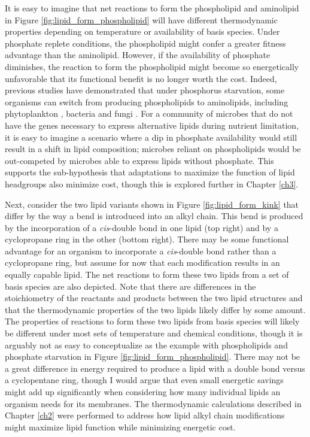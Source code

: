 It is easy to imagine that net reactions to form the phospholipid and aminolipid in Figure \ref{fig:lipid_form_phospholipid} will have different thermodynamic properties depending on temperature or availability of basis species. Under phosphate replete conditions, the phospholipid might confer a greater fitness advantage than the aminolipid. However, if the availability of phosphate diminishes, the reaction to form the phospholipid might become so energetically unfavorable that its functional benefit is no longer worth the cost. Indeed, previous studies have demonstrated that under phosphorus starvation, some organisms can switch from producing phospholipids to aminolipids, including phytoplankton \citep{van2009phytoplankton, martin2011phosphorus}, bacteria \citep{minnikin1974replacement, benning1995accumulation} and fungi \citep{riekhof2014phosphate}. For a community of microbes that do not have the genes necessary to express alternative lipids during nutrient limitation, it is easy to imagine a scenario where a dip in phosphate availability would still result in a shift in lipid composition; microbes reliant on phospholipids would be out-competed by microbes able to express lipids without phosphate. This supports the sub-hypothesis that adaptations to maximize the function of lipid headgroups also minimize cost, though this is explored further in Chapter \ref{ch3}.

Next, consider the two lipid variants shown in Figure \ref{fig:lipid_form_kink} that differ by the way a bend is introduced into an alkyl chain. This bend is produced by the incorporation of a \textit{cis}-double bond in one lipid (top right) and by a cyclopropane ring in the other (bottom right). There may be some functional advantage for an organism to incorporate a \textit{cis}-double bond rather than a cyclopropane ring, but assume for now that each modification results in an equally capable lipid. The net reactions to form these two lipids from a set of basis species are also depicted. Note that there are differences in the stoichiometry of the reactants and products between the two lipid structures and that the thermodynamic properties of the two lipids likely differ by some amount. The properties of reactions to form these two lipids from basis species will likely be different under most sets of temperature and chemical conditions, though it is arguably not as easy to conceptualize as the example with phospholipids and phosphate starvation in Figure \ref{fig:lipid_form_phospholipid}. There may not be a great difference in energy required to produce a lipid with a double bond versus a cyclopentane ring, though I would argue that even small energetic savings might add up significantly when considering how many individual lipids an organism needs for its membranes. The thermodynamic calculations described in Chapter \ref{ch2} were performed to address how lipid alkyl chain modifications might maximize lipid function while minimizing energetic cost.


